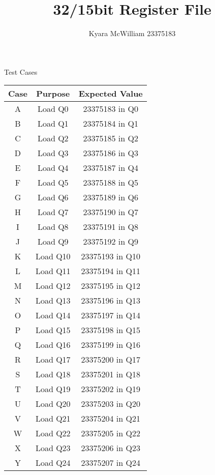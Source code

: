 \documentclass{article}
\title{32/15bit Register File}
\author{Kyara McWilliam 23375183}
\date{}
\begin{document}
\maketitle

Test Cases
\hfill \break

\begin{tabular}{ |c|c|c| }
\hline
Case & Purpose & Expected Value \\
\hline
A & Load Q0 & 23375183 in Q0 \\
B & Load Q1 & 23375184 in Q1\\
C & Load Q2 & 23375185 in Q2\\
D & Load Q3 & 23375186 in Q3\\
E & Load Q4 & 23375187 in Q4\\
F & Load Q5 & 23375188 in Q5\\
G & Load Q6 & 23375189 in Q6\\
H & Load Q7 & 23375190 in Q7\\
I & Load Q8 & 23375191 in Q8\\
J & Load Q9 & 23375192 in Q9\\
K & Load Q10 & 23375193 in Q10\\
L & Load Q11 & 23375194 in Q11\\
M & Load Q12 & 23375195 in Q12\\
N & Load Q13 & 23375196 in Q13\\
O & Load Q14 & 23375197 in Q14\\
P & Load Q15 & 23375198 in Q15\\
Q & Load Q16 & 23375199 in Q16\\
R & Load Q17 & 23375200 in Q17\\
S & Load Q18 & 23375201 in Q18\\
T & Load Q19 & 23375202 in Q19\\
U & Load Q20 & 23375203 in Q20\\
V & Load Q21 & 23375204 in Q21\\
W & Load Q22 & 23375205 in Q22\\
X & Load Q23 & 23375206 in Q23\\
Y & Load Q24 & 23375207 in Q24\\
\hline
\end{tabular}
\end{document}
